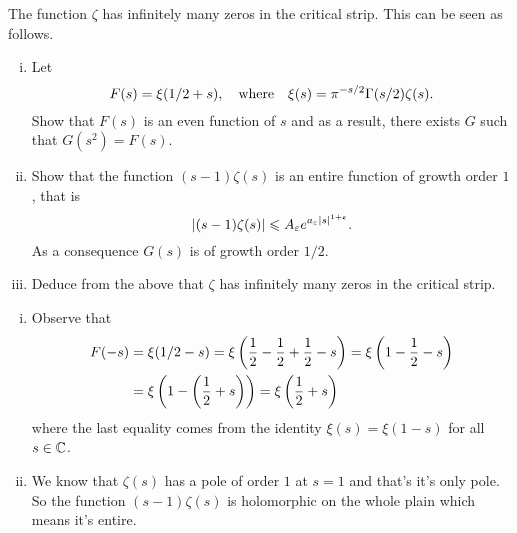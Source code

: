 \documentclass[12pt]{memoir}
\begin{document}
\begin{Ej}
    The function $\zeta$ has infinitely many zeros in the critical strip. This can be seen as follows.
    \begin{enumerate}[i)]
        \item Let 
        $$F(s)=\xi(1/2+s),\quad\text{where}\quad\xi(s)=\pi^{-s/2}\Gamma(s/2)\zeta(s).$$
        Show that $F(s)$ is an even function of $s$ and as a result, there exists $G$ such that $G(s^2)=F(s)$.
        \item Show that the function $(s-1)\zeta(s)$ is an entire function of growth order $1$, that is 
        $$|(s-1)\zeta(s)|\leqslant A_\varepsilon e^{a_\varepsilon|s|^{1+\varepsilon}}.$$
        As a consequence $G(s)$ is of growth order $1/2$.
        \item Deduce from the above that $\zeta$ has infinitely many zeros in the critical strip.
    \end{enumerate}
\end{Ej}

\begin{ptcbr}
    \begin{enumerate}[i)]
        \item Observe that 
        \begin{align*}    
        F(-s)&=\xi(1/2-s)=\xi\left(\half-\half+\half-s\right)=\xi\left(1-\half-s\right)\\
        &=\xi\left(1-\left(\half+s\right)\right)=\xi\left(\half+s\right)
        \end{align*}
        where the last equality comes from the identity $\xi(s)=\xi(1-s)$ for all $s\in\mathbb{C}$.
        \item We know that $\zeta(s)$ has a pole of order $1$ at $s=1$ and that's it's only pole. So the function $(s-1)\zeta(s)$ is holomorphic on the whole plain which means it's entire.
    \end{enumerate}
\end{ptcbr}
\end{document}

